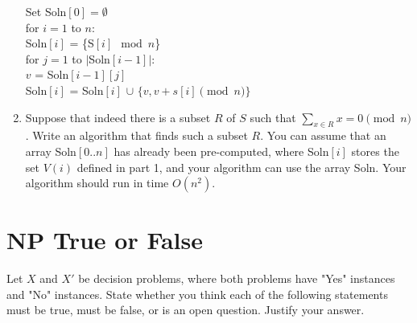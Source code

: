 \documentclass[11pt]{article}
\def\question#1{\red{#1}}
\def\red#1{{\color{red}#1}}
\begin{document}
\begin{enumerate}
{\begin{tabbing}
\>\> Set Soln$[0] = \emptyset$ \\
\>\> for $i = 1$ to $n$: \\
\>\>\> Soln$[i]$ = \{S$[i] \mod n$\} \\
\>\>\> for $j = 1$ to $|$Soln$[i-1]|$: \\
\>\>\>\> $v$ = Soln$[i-1][j]$ \\
\>\>\>\> Soln$[i]$ = Soln$[i]$ $\cup$ $\{v, v+s[i] \pmod n\}$ \\
\end{tabbing}
}
\item Suppose that indeed there is a subset $R$ of $S$ such that $\sum_{x
   \in R} x = 0 \pmod n$.  \question{Write an algorithm that finds such a subset
$R$}.  You can assume that an array Soln$[0..n]$ has already been
pre-computed, where Soln$[i]$ stores the set $V(i)$ defined in part 1,
and your algorithm can use the array Soln. Your algorithm should
run in time $O(n^2)$.
\end{enumerate}

\section{NP True or False}
\label{sec-2}
Let $X$ and $X'$ be decision problems, where both problems
have "Yes" instances and "No" instances.
\question{State whether you think each of the following statements must be true,
must be false, or is an open question. Justify your answer.}
\end{document}
